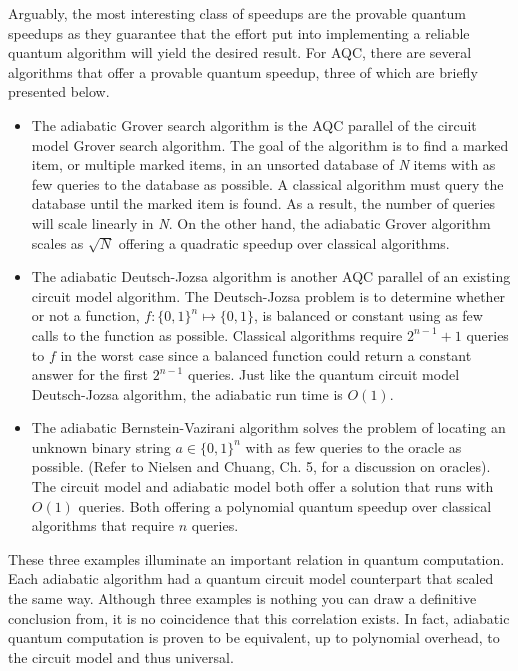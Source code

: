 \documentclass[%
 reprint,
 amsmath,amssymb,
 aps,
]{revtex4-1}
\begin{document}
   Arguably, the most interesting class of speedups are the provable quantum speedups as they guarantee that the effort put into implementing a reliable quantum algorithm will yield the desired result. For AQC, there are several algorithms that offer a provable quantum speedup, three of which are briefly presented below.
   
   \begin{itemize}
   	\item The adiabatic Grover search algorithm is the AQC parallel of the circuit model Grover search algorithm. The goal of the algorithm is to find a marked item, or multiple marked items, in an unsorted database of \textit{N} items with as few queries to the database as possible. A classical algorithm must query the database until the marked item is found. As a result, the number of queries will scale linearly in \textit{N}. On the other hand, the adiabatic Grover algorithm scales as $\sqrt{N}$ offering a quadratic speedup over classical algorithms.
   \item The adiabatic Deutsch-Jozsa algorithm is another AQC parallel of an existing circuit model algorithm. The Deutsch-Jozsa problem is to determine whether or not a function, $f: \lbrace0,1\rbrace^n \longmapsto \lbrace0,1\rbrace$, is balanced or constant using as few calls to the function as possible. Classical algorithms require $2^{n-1} + 1$ queries to $f$ in the worst case since a balanced function could return a constant answer for the first $2^{n-1}$ queries. Just like the quantum circuit model Deutsch-Jozsa algorithm, the adiabatic run time is $O(1)$.
   \item The adiabatic Bernstein-Vazirani algorithm solves the problem of locating an unknown binary string $ a \in \lbrace0,1\rbrace^n  $ with as few queries to the oracle as possible. (Refer to Nielsen and Chuang, Ch. 5, for a discussion on oracles). The circuit model and adiabatic model both offer a solution that runs with $O(1)$ queries. Both offering a polynomial quantum speedup over classical algorithms that require $n$ queries.
   \end{itemize}
   
   These three examples illuminate an important relation in quantum computation. Each adiabatic algorithm had a quantum circuit model counterpart that scaled the same way. Although three examples is nothing you can draw a definitive conclusion from, it is no coincidence that this correlation exists. In fact, adiabatic quantum computation is proven to be equivalent, up to polynomial overhead, to the circuit model and thus universal\cite{Aharanov2007}. 
   
\end{document}
